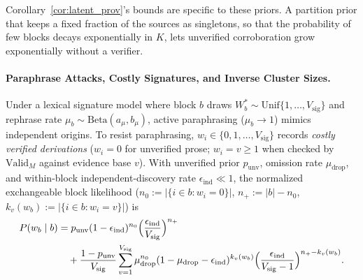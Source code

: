 \documentclass[11pt,a4paper]{article}
\theoremstyle{definition}
\theoremstyle{remark}
\newcommand{\Valid}{\mathrm{Valid}}
\begin{document}
Corollary~\ref{cor:latent_prov}'s bounds are specific to these priors. A partition prior that keeps a fixed fraction of the sources as singletons, so that the probability of few blocks decays exponentially in $K$, lets unverified corroboration grow exponentially without a verifier.

\paragraph{Paraphrase Attacks, Costly Signatures, and Inverse Cluster Sizes.}
Under a lexical signature model where block $b$ draws $W_b^* \sim \mathrm{Unif}\{1,\dots,V_{\mathrm{sig}}\}$ and rephrase rate $\mu_b \sim \mathrm{Beta}(a_\mu, b_\mu)$, active paraphrasing ($\mu_b \to 1$) mimics independent origins. To resist paraphrasing, $w_i \in \{0, 1, \dots, V_{\mathrm{sig}}\}$ records \emph{costly verified derivations} ($w_i = 0$ for unverified prose; $w_i = v \ge 1$ when checked by $\Valid_M$ against evidence base $v$). With unverified prior $p_{\mathrm{unv}}$, omission rate $\mu_{\mathrm{drop}}$, and within-block independent-discovery rate $\epsilon_{\mathrm{ind}} \ll 1$, the normalized exchangeable block likelihood ($n_0 := |\{i \in b : w_i = 0\}|$, $n_+ := |b| - n_0$, $k_v(w_b) := |\{i \in b : w_i = v\}|$) is
\begin{equation}
  \begin{aligned}
    P(w_b \mid b) &= p_{\mathrm{unv}} (1 - \epsilon_{\mathrm{ind}})^{n_0} \Bigl(\frac{\epsilon_{\mathrm{ind}}}{V_{\mathrm{sig}}}\Bigr)^{n_+} \\
    &\quad + \frac{1 - p_{\mathrm{unv}}}{V_{\mathrm{sig}}} \sum_{v=1}^{V_{\mathrm{sig}}} \mu_{\mathrm{drop}}^{n_0} (1 - \mu_{\mathrm{drop}} - \epsilon_{\mathrm{ind}})^{k_v(w_b)} \Bigl(\frac{\epsilon_{\mathrm{ind}}}{V_{\mathrm{sig}} - 1}\Bigr)^{n_+ - k_v(w_b)}.
  \end{aligned}
  \label{eq:deriv_sig_lik}
\end{equation}
\end{document}
